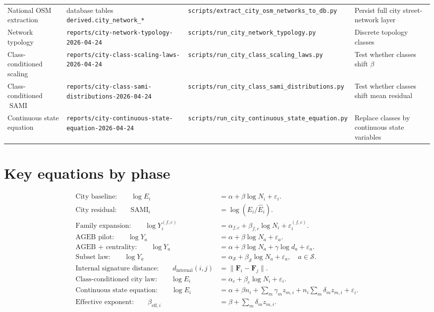 \documentclass[11pt]{article}
\newcommand{\SAMI}{\operatorname{SAMI}}
\begin{document}
\begin{landscape}
\begin{longtable}{p{}p{}p{}p{}}
National OSM extraction & database tables \texttt{derived.city\_network\_*} & \texttt{scripts/extract\_city\_osm\_networks\_to\_db.py} & Persist full city street-network layer \\
Network typology & \texttt{reports/city-network-typology-2026-04-24} & \texttt{scripts/run\_city\_network\_typology.py} & Discrete topology classes \\
Class-conditioned scaling & \texttt{reports/city-class-scaling-laws-2026-04-24} & \texttt{scripts/run\_city\_class\_scaling\_laws.py} & Test whether classes shift \(\beta\) \\
Class-conditioned \(\SAMI\) & \texttt{reports/city-class-sami-distributions-2026-04-24} & \texttt{scripts/run\_city\_class\_sami\_distributions.py} & Test whether classes shift mean residual \\
Continuous state equation & \texttt{reports/city-continuous-state-equation-2026-04-24} & \texttt{scripts/run\_city\_continuous\_state\_equation.py} & Replace classes by continuous state variables \\
\bottomrule
\end{longtable}
\end{landscape}

\section{Key equations by phase}

\begin{align}
\text{City baseline:}\qquad
\log E_i &= \alpha + \beta \log N_i + \varepsilon_i.\\
\text{City residual:}\qquad
\SAMI_i &= \log(E_i/\widehat{E}_i).\\
\text{Family expansion:}\qquad
\log Y_i^{(f,c)} &= \alpha_{f,c} + \beta_{f,c}\log N_i + \varepsilon_i^{(f,c)}.\\
\text{AGEB pilot:}\qquad
\log Y_a &= \alpha + \beta \log N_a + \varepsilon_a.\\
\text{AGEB + centrality:}\qquad
\log Y_a &= \alpha + \beta \log N_a + \gamma \log d_a + \varepsilon_a.\\
\text{Subset law:}\qquad
\log Y_a &= \alpha_{\mathcal{S}} + \beta_{\mathcal{S}}\log N_a + \varepsilon_a,\quad a\in\mathcal{S}.\\
\text{Internal signature distance:}\qquad
d_{\mathrm{internal}}(i,j) &= \|\mathbf{F}_i-\mathbf{F}_j\|.\\
\text{Class-conditioned city law:}\qquad
\log E_i &= \alpha_c + \beta_c \log N_i + \varepsilon_i.\\
\text{Continuous state equation:}\qquad
\log E_i &= \alpha + \beta n_i + \sum_m \gamma_m z_{m,i} + n_i\sum_m \delta_m z_{m,i} + \varepsilon_i.\\
\text{Effective exponent:}\qquad
\beta_{\mathrm{eff},i} &= \beta + \sum_m \delta_m z_{m,i}.
\end{align}
\end{document}
